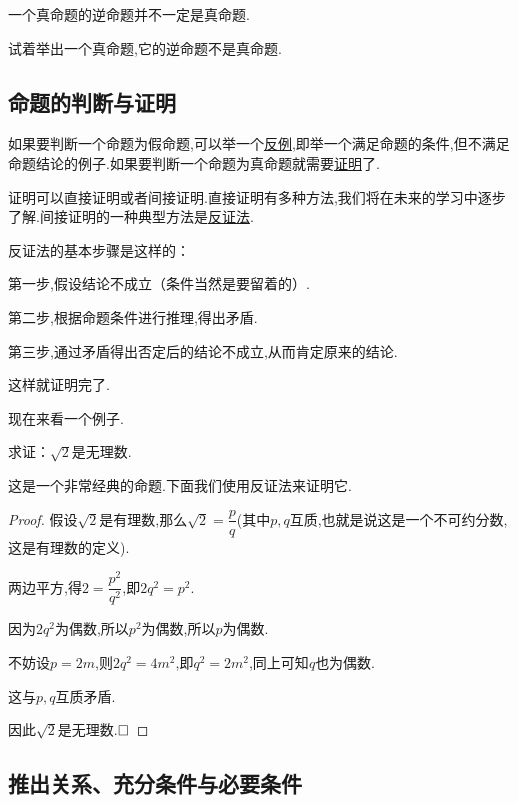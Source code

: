 \documentclass[lang=cn,math=cm,chinesefont=nofont,11pt,scheme=chinese,twocol]{elegantbook}
\begin{document}
\begin{remark}
  一个真命题的逆命题并不一定是真命题.
\end{remark}

\begin{exercise}\label{exer:202405021028}
  试着举出一个真命题,它的逆命题不是真命题.
\end{exercise}


\subsection{命题的判断与证明}

如果要判断一个命题为假命题,可以举一个\underline{反例},即举一个满足命题的条件,但不满足命题结论的例子.如果要判断一个命题为真命题就需要\underline{证明}了.

证明可以直接证明或者间接证明.直接证明有多种方法,我们将在未来的学习中逐步了解.间接证明的一种典型方法是\underline{反证法}.

反证法的基本步骤是这样的：

第一步,假设结论不成立（条件当然是要留着的）.

第二步,根据命题条件进行推理,得出矛盾.

第三步,通过矛盾得出否定后的结论不成立,从而肯定原来的结论.

这样就证明完了.

\hspace*{\fill}

现在来看一个例子.

\begin{example}
  求证：$\sqrt{2}$是无理数.
\end{example}
这是一个非常经典的命题.下面我们使用反证法来证明它.
\begin{proof}
  假设$\sqrt{2}$是有理数,那么$\sqrt{2}=\dfrac{p}{q}$(其中$p,q$互质,也就是说这是一个不可约分数,这是有理数的定义).

  两边平方,得$2=\dfrac{p^2}{q^2}$,即$2q^2=p^2$.

  因为$2q^2$为偶数,所以$p^2$为偶数,所以$p$为偶数.

  不妨设$p=2m$,则$2q^2=4m^2$,即$q^2=2m^2$,同上可知$q$也为偶数.

  这与$p,q$互质矛盾.

  因此$\sqrt{2}$是无理数.$\hfill\square$

\end{proof}

\subsection{推出关系、充分条件与必要条件}
\end{document}

